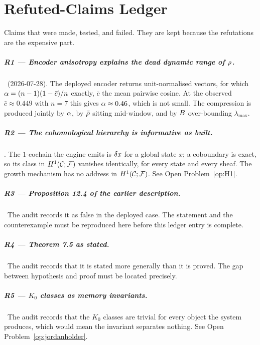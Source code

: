 \chapter{Refuted-Claims Ledger}\label{app:refuted}

Claims that were made, tested, and failed. They are kept because the
refutations are the expensive part.

\paragraph{R1 --- Encoder anisotropy explains the dead dynamic range of
$\rho$.} \Refuted\ (2026-07-28). The deployed encoder returns
unit-normalised vectors, for which $\alpha=(n-1)(1-\bar c)/n$ exactly,
$\bar c$ the mean pairwise cosine. At the observed $\bar c\approx0.449$
with $n=7$ this gives $\alpha\approx0.46$, which is not small. The
compression is produced jointly by $\alpha$, by $\tilde{\rho}$ sitting
mid-window, and by $B$ over-bounding $\lambda_{\max}$.

\paragraph{R2 --- The cohomological hierarchy is informative as built.}
\Refuted. The $1$-cochain the engine emits is $\delta x$ for a global
state $x$; a coboundary is exact, so its class in $H^{1}(\mathcal{C};\mathcal{F})$ vanishes
identically, for every state and every sheaf. The growth mechanism has
no address in $H^{1}(\mathcal{C};\mathcal{F})$. See Open Problem~\ref{op:H1}.

\paragraph{R3 --- Proposition 12.4 of the earlier description.}
\Contested\ The audit records it as false in the deployed case. The
statement and the counterexample must be reproduced here before this
ledger entry is complete.

\paragraph{R4 --- Theorem 7.5 as stated.}
\Contested\ The audit records that it is stated more generally than it
is proved. The gap between hypothesis and proof must be located
precisely.

\paragraph{R5 --- $K_0$ classes as memory invariants.}
\Contested\ The audit records that the $K_0$ classes are trivial for
every object the system produces, which would mean the invariant
separates nothing. See Open Problem~\ref{op:jordanholder}.
